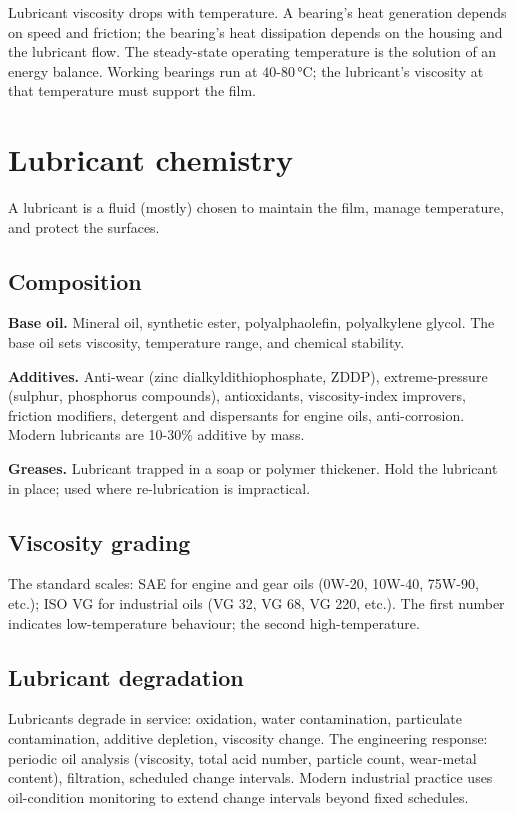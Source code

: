 Lubricant viscosity drops with temperature. A bearing's heat generation depends on speed and friction; the bearing's heat dissipation depends on the housing and the lubricant flow. The steady-state operating temperature is the solution of an energy balance. Working bearings run at $40$-$80\,\si{\degreeCelsius}$; the lubricant's viscosity at that temperature must support the film.

\section{Lubricant chemistry}

A lubricant is a fluid (mostly) chosen to maintain the film, manage temperature, and protect the surfaces.

\subsection{Composition}

\textbf{Base oil.} Mineral oil, synthetic ester, polyalphaolefin, polyalkylene glycol. The base oil sets viscosity, temperature range, and chemical stability.

\textbf{Additives.} Anti-wear (zinc dialkyldithiophosphate, ZDDP), extreme-pressure (sulphur, phosphorus compounds), antioxidants, viscosity-index improvers, friction modifiers, detergent and dispersants for engine oils, anti-corrosion. Modern lubricants are 10-30\% additive by mass.

\textbf{Greases.} Lubricant trapped in a soap or polymer thickener. Hold the lubricant in place; used where re-lubrication is impractical.

\subsection{Viscosity grading}

The standard scales: SAE for engine and gear oils (0W-20, 10W-40, 75W-90, etc.); ISO VG for industrial oils (VG 32, VG 68, VG 220, etc.). The first number indicates low-temperature behaviour; the second high-temperature.

\subsection{Lubricant degradation}

Lubricants degrade in service: oxidation, water contamination, particulate contamination, additive depletion, viscosity change. The engineering response: periodic oil analysis (viscosity, total acid number, particle count, wear-metal content), filtration, scheduled change intervals. Modern industrial practice uses oil-condition monitoring to extend change intervals beyond fixed schedules.

